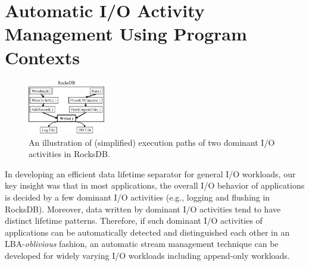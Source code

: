 \section{Automatic I/O Activity Management Using Program Contexts}
\label{sec:programcontext}
\begin{figure}[t]
	\centering
	\includegraphics[width=0.3\textwidth]{figure/writepath}
	\caption{An illustration of (simplified) execution paths of two dominant I/O activities in RocksDB.}
	\label{fig:iopath}
\end{figure}

In developing an efficient data lifetime separator for general I/O workloads,
our key insight was that in most applications,
the overall I/O behavior of 
applications is decided by a few dominant
I/O activities (e.g., logging and flushing in RocksDB). 
Moreover, 
data written by dominant I/O activities tend to have distinct lifetime patterns.
Therefore, if such dominant I/O activities of applications can be 
automatically detected and distinguished each other in an LBA-{\it oblivious} fashion, 
an automatic stream management technique can be developed for widely varying I/O workloads 
including append-only workloads.

